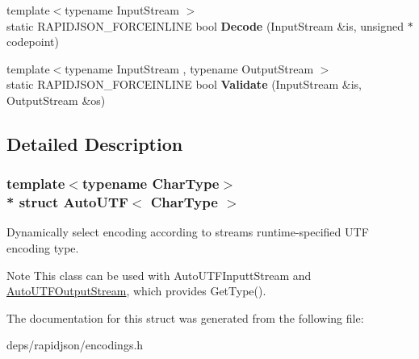\begin{DoxyCompactItemize}
\item 
{\footnotesize template$<$typename Input\+Stream $>$ }\\static R\+A\+P\+I\+D\+J\+S\+O\+N\+\_\+\+F\+O\+R\+C\+E\+I\+N\+L\+I\+NE bool {\bfseries Decode} (Input\+Stream \&is, unsigned $\ast$codepoint)\hypertarget{struct_auto_u_t_f_aa5e3c1dc23dbb75f6442ff69500a35b0}{}\label{struct_auto_u_t_f_aa5e3c1dc23dbb75f6442ff69500a35b0}

\item 
{\footnotesize template$<$typename Input\+Stream , typename Output\+Stream $>$ }\\static R\+A\+P\+I\+D\+J\+S\+O\+N\+\_\+\+F\+O\+R\+C\+E\+I\+N\+L\+I\+NE bool {\bfseries Validate} (Input\+Stream \&is, Output\+Stream \&os)\hypertarget{struct_auto_u_t_f_a36dd6f226d6a07c12161e21c0aff20b1}{}\label{struct_auto_u_t_f_a36dd6f226d6a07c12161e21c0aff20b1}

\end{DoxyCompactItemize}


\subsection{Detailed Description}
\subsubsection*{template$<$typename Char\+Type$>$\\*
struct Auto\+U\+T\+F$<$ Char\+Type $>$}

Dynamically select encoding according to stream\textquotesingle{}s runtime-\/specified U\+TF encoding type. 

\begin{DoxyNote}{Note}
This class can be used with Auto\+U\+T\+F\+Inputt\+Stream and \hyperlink{class_auto_u_t_f_output_stream}{Auto\+U\+T\+F\+Output\+Stream}, which provides Get\+Type(). 
\end{DoxyNote}


The documentation for this struct was generated from the following file\+:\begin{DoxyCompactItemize}
\item 
deps/rapidjson/encodings.\+h\end{DoxyCompactItemize}
